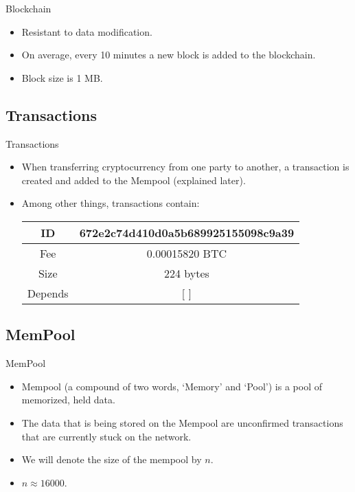 \documentclass{beamer}
\begin{document}
\begin{frame}{Blockchain} %
    \begin{itemize}
        \item {Resistant to data modification.}
        \item {On average, every 10 minutes a new block is added to
        the blockchain.}
        \item {Block size is 1 MB.}
    \end{itemize}
\end{frame}
\subsection*{Transactions}

\begin{frame}{Transactions}
    \begin{itemize}
        \item {When transferring cryptocurrency from one party to another, 
        a transaction is created and added to the Mempool (explained 
        later).}
        \item {Among other things, transactions contain:}
        \begin{table}[]
            \centering
            \begin{tabular}{c|c}
                \hline
                ID & 672e2c74d410d0a5b689925155098c9a39 \\ 
                \hline
                Fee & 0.00015820 BTC \\
                \hline
                Size & 224 bytes \\
                \hline
                Depends & [ ] \\
                \hline
            \end{tabular}
            \label{tab:my_label3}
        \end{table}
    \end{itemize}
\end{frame}
\subsection*{MemPool}

\begin{frame}{MemPool}
    \begin{itemize}
        \item {Mempool (a compound of two words, `Memory' and `Pool') is a 
        pool of memorized, held data.}
        \item {The data that is being stored on the Mempool are unconfirmed 
        transactions that are currently stuck on the network.}
        \item {We will denote the size of the mempool by $n$.}
        \item {$n \approx 16000$.}
    \end{itemize}
\end{frame}
\end{document}
